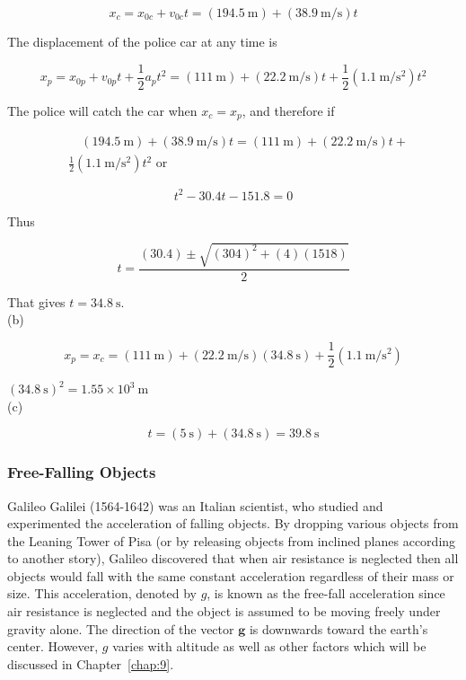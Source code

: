 \documentclass[10pt]{article}
\numberwithin{equation}{section}
\begin{document}
$$
x_{c}=x_{0 c}+v_{0 c} t=(194.5 \mathrm{~m})+(38.9 \mathrm{~m} / \mathrm{s}) t
$$

The displacement of the police car at any time is

$$
x_{p}=x_{0 p}+v_{0 p} t+\frac{1}{2} a_{p} t^{2}=(111 \mathrm{~m})+(22.2 \mathrm{~m} / \mathrm{s}) t+\frac{1}{2}\left(1.1 \mathrm{~m} / \mathrm{s}^{2}\right) t^{2}
$$

The police will catch the car when $x_{c}=x_{p}$, and therefore if

$$
\begin{aligned}
& \quad(194.5 \mathrm{~m})+(38.9 \mathrm{~m} / \mathrm{s}) t=(111 \mathrm{~m})+(22.2 \mathrm{~m} / \mathrm{s}) t+ \\
& \frac{1}{2}\left(1.1 \mathrm{~m} / \mathrm{s}^{2}\right) t^{2} \text { or }
\end{aligned}
$$

$$
t^{2}-30.4 t-151.8=0
$$

Thus

$$
t=\frac{(30.4) \pm \sqrt{(304)^{2}+(4)(1518)}}{2}
$$

That gives $t=34.8 \mathrm{~s}$.\\
(b)

$$
x_{p}=x_{c}=(111 \mathrm{~m})+(22.2 \mathrm{~m} / \mathrm{s})(34.8 \mathrm{~s})+\frac{1}{2}\left(1.1 \mathrm{~m} / \mathrm{s}^{2}\right)
$$

$(34.8 \mathrm{~s})^{2}=1.55 \times 10^{3} \mathrm{~m}$\\
(c)

$$
t=(5 \mathrm{~s})+(34.8 \mathrm{~s})=39.8 \mathrm{~s}
$$

\subsubsection{Free-Falling Objects}\label{sec:2-4-2}
Galileo Galilei (1564-1642) was an Italian scientist, who studied and experimented the acceleration of falling objects. By dropping various objects from the Leaning Tower of Pisa (or by releasing objects from inclined planes according to another story), Galileo discovered that when air resistance is neglected then all objects would fall with the same constant acceleration regardless of their mass or size. This acceleration, denoted by $g$, is known as the free-fall acceleration since air resistance is neglected and the object is assumed to be moving freely under gravity alone. The direction of the vector $\mathbf{g}$ is downwards toward the earth's center. However, $g$ varies with altitude as well as other factors which will be discussed in Chapter~\ref{chap:9}.
\end{document}
